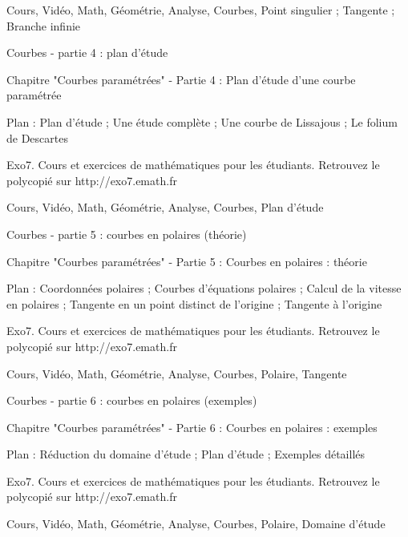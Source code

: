 
Cours, Vidéo, Math, Géométrie, Analyse, Courbes, Point singulier ; Tangente ; Branche infinie




Courbes - partie 4 : plan d'étude



Chapitre "Courbes paramétrées" - Partie 4 : Plan d'étude d'une courbe paramétrée

Plan : Plan d'étude ; Une étude complète ; Une courbe de Lissajous ; Le folium de Descartes

Exo7. Cours et exercices de mathématiques pour les étudiants.
Retrouvez le polycopié sur http://exo7.emath.fr


Cours, Vidéo, Math, Géométrie, Analyse, Courbes, Plan d'étude




Courbes - partie 5 : courbes en polaires (théorie)



Chapitre "Courbes paramétrées" - Partie 5 : Courbes en polaires : théorie

Plan : Coordonnées polaires ; Courbes d'équations polaires ; Calcul de la vitesse en polaires ;
Tangente en un point distinct de l'origine ; Tangente à l'origine

Exo7. Cours et exercices de mathématiques pour les étudiants.
Retrouvez le polycopié sur http://exo7.emath.fr


Cours, Vidéo, Math, Géométrie, Analyse, Courbes, Polaire, Tangente




Courbes - partie 6 : courbes en polaires (exemples)



Chapitre "Courbes paramétrées" - Partie 6 : Courbes en polaires : exemples

Plan : Réduction du domaine d'étude ; Plan d'étude ; Exemples détaillés

Exo7. Cours et exercices de mathématiques pour les étudiants.
Retrouvez le polycopié sur http://exo7.emath.fr


Cours, Vidéo, Math, Géométrie, Analyse, Courbes, Polaire, Domaine d'étude


